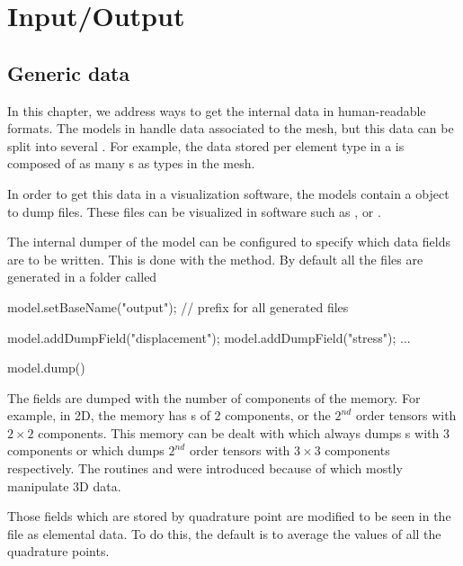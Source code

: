 \chapter{Input/Output}

\section{Generic data}
In this chapter, we address ways to get the internal data in human-readable formats.
The models in \akantu handle data associated to the
mesh, but this data can be split into several . For example, the
data stored per element type in a  is composed of as
many s as types in the mesh.

In order to get this data in a visualization software, the models contain a
object to dump  files. These files can be visualized in software such
as \cite{paraview}, \cite{visit} or \cite{mayavi}.

The internal dumper of the model can be configured to specify which data fields
are to be written. This is done with the
 method. By default all the files
are generated in a folder called 

\begin{cpp}
  model.setBaseName("output"); // prefix for all generated files

  model.addDumpField("displacement");
  model.addDumpField("stress");
  ...

  model.dump()
\end{cpp}

The fields are dumped with the number of components of the memory. For example, in 2D, the memory has 
s of 2 components, or the $2^{nd}$ order tensors with $2\times2$ components.  
This memory can be dealt with  which always dumps
s with 3 components or  which dumps $2^{nd}$
order tensors with $3\times3$ components respectively. The routines  and
 were introduced because of  which mostly manipulate 3D data.

Those fields which are stored by quadrature point are modified to be seen in the
 file as elemental data. To do this, the default is to average the
values of all the quadrature points.

